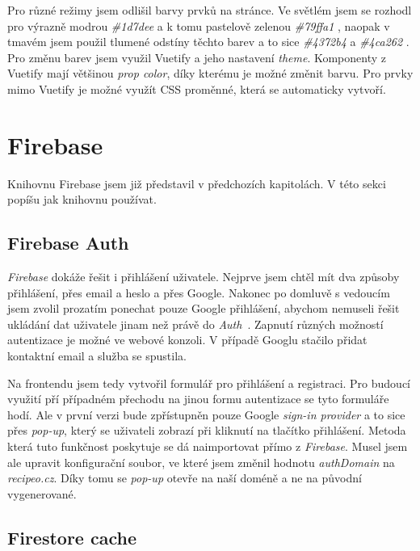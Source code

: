Pro různé režimy jsem odlišil barvy prvků na stránce. Ve světlém jsem se rozhodl pro výrazně modrou \emph{\#1d7dee}  a k tomu
pastelově zelenou \emph{\#79ffa1}  , naopak v tmavém jsem použil tlumené odstíny těchto barev a to sice \emph{\#4372b4}   a \emph{\#4ca262}  .
Pro změnu barev jsem využil Vuetify a jeho nastavení \emph{theme}. Komponenty z Vuetify mají většinou \emph{prop color}, díky
kterému je možné změnit barvu. Pro prvky mimo Vuetify je možné využít CSS proměnné, která se automaticky vytvoří.

\section{Firebase}

Knihovnu Firebase jsem již představil v předchozích kapitolách. V této sekci popíšu jak knihovnu používat.

\subsection{Firebase Auth}
\emph{Firebase} dokáže řešit i přihlášení uživatele. Nejprve jsem chtěl mít dva způsoby přihlášení, přes email a heslo a přes
Google. Nakonec po domluvě s vedoucím jsem zvolil prozatím ponechat pouze Google přihlášení, abychom nemuseli řešit ukládání
dat uživatele jinam než právě do \emph{Auth}~\cite{FirebaseAuth}. Zapnutí různých možností autentizace je možné ve webové konzoli. V případě Googlu
stačilo přidat kontaktní email a služba se spustila.

Na frontendu jsem tedy vytvořil formulář pro přihlášení a registraci. Pro budoucí využití pří případném přechodu na jinou formu
autentizace se tyto formuláře hodí. Ale v první verzi bude zpřístupněn pouze Google \emph{sign-in provider} a to sice přes \emph{pop-up},
který se uživateli zobrazí při kliknutí na tlačítko přihlášení. Metoda která tuto funkčnost poskytuje se dá naimportovat přímo
z \emph{Firebase}. Musel jsem ale upravit konfigurační soubor, ve které jsem změnil hodnotu \emph{authDomain} na \emph{recipeo.cz}.
Díky tomu se \emph{pop-up} otevře na naší doméně a ne na původní vygenerované.

\subsection{Firestore cache}
